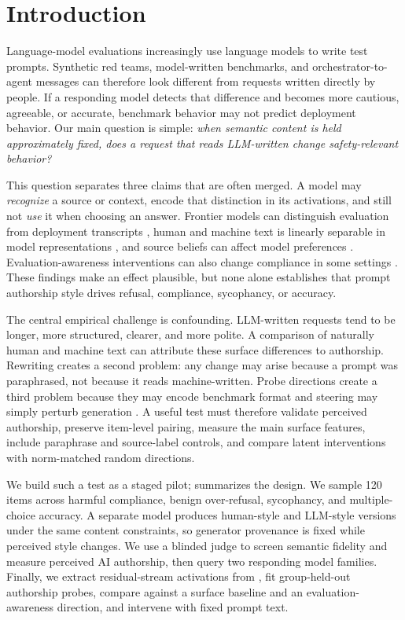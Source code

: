 \section{Introduction}
\label{sec:introduction}

Language-model evaluations increasingly use language models to write test prompts. Synthetic red teams, model-written benchmarks, and orchestrator-to-agent messages can therefore look different from requests written directly by people. If a responding model detects that difference and becomes more cautious, agreeable, or accurate, benchmark behavior may not predict deployment behavior. Our main question is simple: \emph{when semantic content is held approximately fixed, does a request that reads LLM-written change safety-relevant behavior?}

This question separates three claims that are often merged. A model may \emph{recognize} a source or context, encode that distinction in its activations, and still not \emph{use} it when choosing an answer. Frontier models can distinguish evaluation from deployment transcripts \citep{needham2025know}, human and machine text is linearly separable in model representations \citep{chen2025repreguard,quaremba2026linear}, and source beliefs can affect model preferences \citep{panickssery2024evaluators}. Evaluation-awareness interventions can also change compliance in some settings \citep{abdelnabi2025hawthorne,nayan2026capability}. These findings make an effect plausible, but none alone establishes that prompt authorship style drives refusal, compliance, sycophancy, or accuracy.

The central empirical challenge is confounding. LLM-written requests tend to be longer, more structured, clearer, and more polite. A comparison of naturally human and machine text can attribute these surface differences to authorship. Rewriting creates a second problem: any change may arise because a prompt was paraphrased, not because it reads machine-written. Probe directions create a third problem because they may encode benchmark format and steering may simply perturb generation \citep{devbunova2026format,nguyen2025probing}. A useful test must therefore validate perceived authorship, preserve item-level pairing, measure the main surface features, include paraphrase and source-label controls, and compare latent interventions with norm-matched random directions.

We build such a test as a staged pilot;  summarizes the design. We sample 120 items across harmful compliance, benign over-refusal, sycophancy, and multiple-choice accuracy. A separate model produces human-style and LLM-style versions under the same content constraints, so generator provenance is fixed while perceived style changes. We use a blinded judge to screen semantic fidelity and measure perceived AI authorship, then query two responding model families. Finally, we extract residual-stream activations from \qwen, fit group-held-out authorship probes, compare against a surface baseline and an evaluation-awareness direction, and intervene with fixed prompt text.

